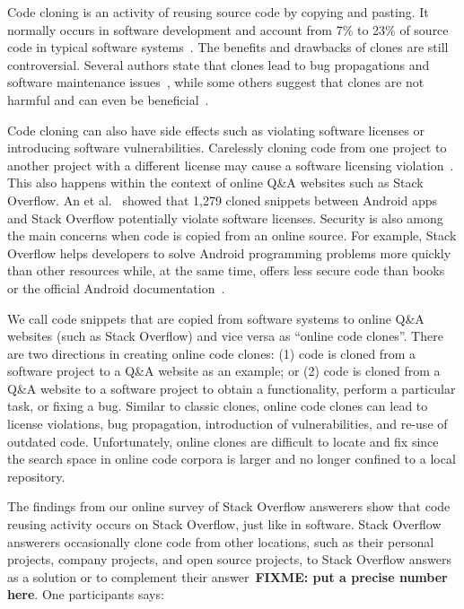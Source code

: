 \documentclass[10pt,journal,compsoc]{IEEEtran}
\newcommand\FIXME[1]{{\color{red}\textbf{FIXME: #1}}}
\begin{document}
Code cloning is an activity of reusing source code by copying and
pasting. It normally occurs in software development and account from
7\% to 23\% of source code in typical software
systems~\cite{Bellon2007}. The benefits and drawbacks of clones are
still controversial. Several authors state that clones lead to bug
propagations and software maintenance issues~\cite{Kamiya2002}, while
some others suggest that clones are not harmful and can even be
beneficial~\cite{Saini2016,Kapser2006}.

Code cloning can also have side effects such as violating software
licenses or introducing software vulnerabilities. Carelessly cloning
code from one project to another project with a different license may
cause a software licensing violation~\cite{German2009}. This also
happens within the context of online Q\&A websites such as Stack
Overflow. An et al.~\cite{An2017} showed that 1,279 cloned snippets
between Android apps and Stack Overflow potentially violate software
licenses. Security is also among the main concerns when code is copied
from an online source. For example, Stack Overflow helps developers to solve
Android programming problems more quickly than other resources while,
at the same time, offers less secure code than books or the official
Android documentation~\cite{Acar2016}.

We call code snippets that are copied from software systems to online
Q\&A websites (such as Stack Overflow) and vice versa as ``online
code clones''. There are two
directions in creating online code clones: (1) code is cloned from a software
project to a Q\&A website as an example; or (2) code is cloned from a
Q\&A website to a software project to obtain a functionality, perform
a particular task, or fixing a bug.
Similar to classic clones, online code clones can lead to license
violations, bug propagation, introduction of vulnerabilities, and
re-use of outdated code. Unfortunately, online clones are 
difficult to locate and fix since the search space in online code
corpora is larger and no longer confined to a local repository.

The findings from our online survey of Stack Overflow answerers show that code
reusing activity occurs on Stack Overflow, just like in software. Stack Overflow
answerers occasionally clone code from other locations, such as their personal
projects, company projects, and open source projects, to Stack Overflow answers
as a solution or to complement their answer~\FIXME{put a precise number here}.
One participants says:
\end{document}
